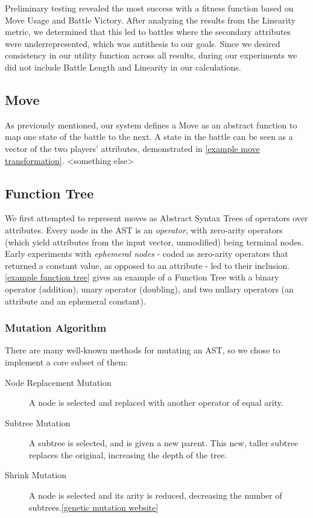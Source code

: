 \documentclass{acm_proc_article-sp}
\begin{document}
Preliminary testing revealed the most success with a fitness function based on Move Usage and Battle Victory. After analyzing the results from the Linearity metric, we determined that this led to battles where the secondary attributes were underrepresented, which was antithesis to our goals. Since we desired consistency in our utility function across all results, during our experiments we did not include Battle Length and Linearity in our calculations.

\subsection{Move}

As previously mentioned, our system defines a Move as an abstract function to map one state of the battle to the next. A state in the battle can be seen as a vector of the two players’ attributes, demonstrated in \ref{example move transformation}. <something else>

\subsection{Function Tree}

We first attempted to represent moves as Abstract Syntax Trees of operators over attributes. Every node in the AST is an \textit{operator}, with zero-arity operators (which yield attributes from the input vector, unmodified) being terminal nodes. Early experiments with \textit{ephemeral nodes} - coded as zero-arity operators that returned a constant value, as opposed to an attribute - led to their inclusion. \ref{example function tree} gives an example of a Function Tree with a binary operator (addition), unary operator (doubling), and two nullary operators (an attribute and an ephemeral constant).

\subsubsection{Mutation Algorithm}

There are many well-known methods for mutating an AST, so we chose to implement a core subset of them:
\begin{description}
    \item[Node Replacement Mutation] A node is selected and replaced with another operator of equal arity.
    \item[Subtree Mutation] A subtree is selected, and is given a new parent. This new, taller subtree replaces the original, increasing the depth of the tree.\cite{geneticprogramming.us}
    \item[Shrink Mutation] A node is selected and its arity is reduced, decreasing the number of subtrees.\ref{genetic mutation website}
\end{description}
\end{document}
